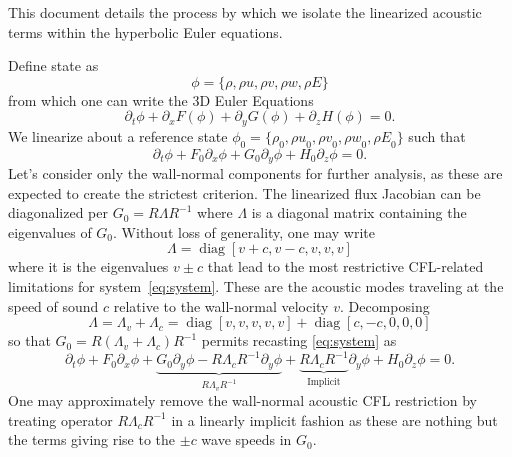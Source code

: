 \documentclass[letterpaper,11pt,nointlimits,reqno]{amsart}
\begin{document}
This document details the process by which we isolate the linearized
acoustic terms within the hyperbolic Euler equations.

Define state as
\begin{equation}
 \phi = \{\rho, \rho u, \rho v, \rho w, \rho E \}
\end{equation}
from which one can write the 3D Euler Equations
\begin{equation}
 \partial_t \phi + \partial_x F(\phi) + \partial_y G(\phi) + \partial_z
  H(\phi) = 0
  .
\end{equation}
We linearize about a reference state $\phi_0 = \{\rho_0, {\rho u}_0,
{\rho v}_0, {\rho w}_0, {\rho E}_0 \}$ such that
\begin{equation}\label{eq:system}
 \partial_t \phi +  F_0 \partial_x \phi + G_0 \partial_y \phi + H_0 \partial_z
  \phi = 0
  .
\end{equation}
Let's consider only the wall-normal components for further analysis, as these
are expected to create the strictest criterion.  The linearized flux Jacobian
can be diagonalized per $G_0 = R \Lambda R^{-1}$ where $\Lambda$ is a diagonal
matrix containing the eigenvalues of $G_0$.  Without loss of generality, one
may write
\begin{equation}
  \Lambda = \operatorname{diag}\left[v+c,v-c,v,v,v\right]
\end{equation}
where it is the eigenvalues $v\pm{}c$ that lead to the most restrictive
CFL-related limitations for system~\eqref{eq:system}.  These are the acoustic
modes traveling at the speed of sound $c$ relative to the wall-normal velocity
$v$.  Decomposing
\begin{equation}\label{eq:eigdecomp}
  \Lambda = \Lambda_v + \Lambda_c =
  \operatorname{diag}\left[v,v,v,v,v\right]
  +
  \operatorname{diag}\left[c,-c,0,0,0\right]
\end{equation}
so that $ G_0 = R \left(\Lambda_v + \Lambda_c\right) R^{-1} $ permits recasting
\eqref{eq:system} as
\begin{equation}
    \partial_t \phi
 +  F_0 \partial_x \phi
 +  \underbrace{
      G_0 \partial_y \phi - R \Lambda_c R^{-1} \partial_y \phi
    }_{R \Lambda_v R^{-1}}
 +  \underbrace{R \Lambda_c R^{-1}}_{\text{Implicit}} \partial_y \phi
 +  H_0 \partial_z \phi
  = 0
  .
\end{equation}
One may approximately remove the wall-normal acoustic CFL restriction by
treating operator $R \Lambda_c R^{-1}$ in a linearly implicit fashion as these
are nothing but the terms giving rise to the $\pm{}c$ wave speeds in $G_0$.
\end{document}
